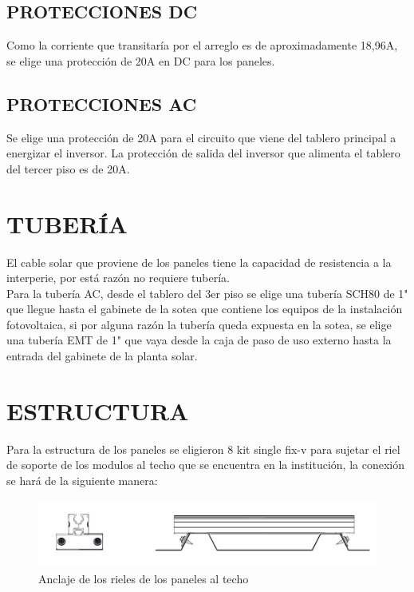 \documentclass[journal]{IEEEtran}
\begin{document}
\subsection*{PROTECCIONES DC}

Como la corriente que transitaría por el arreglo es de aproximadamente 18,96A, se elige una protección de 20A en DC para los paneles.\\



\subsection*{PROTECCIONES AC}

Se elige una protección de 20A para el circuito que viene del tablero principal a energizar el inversor. La protección de salida del inversor que alimenta el tablero del tercer piso es de 20A. 



\section*{TUBERÍA}

El cable solar que proviene de los paneles tiene la capacidad de resistencia a la interperie, por está razón no requiere tubería.\\
Para la tubería AC, desde el tablero del 3er piso se elige una tubería SCH80 de 1" que llegue hasta el gabinete de la sotea que contiene los equipos de la instalación fotovoltaica, si por alguna razón la tubería queda expuesta en la sotea, se elige una tubería EMT de 1" que vaya desde la caja de paso de uso externo hasta la entrada del gabinete de la planta solar. 

\section*{ESTRUCTURA}

Para la estructura de los paneles se eligieron 8 kit single fix-v para sujetar el riel de soporte de los modulos al techo que se encuentra en la institución, la conexión se hará de la siguiente manera: \\

\begin{figure}[H]
    \centering
    \includegraphics[scale=0.3]{anclaje_estrucJPG.JPG}
    \caption{Anclaje de los rieles de los paneles al techo}
    \label{curva}
\end{figure}
\end{document}
